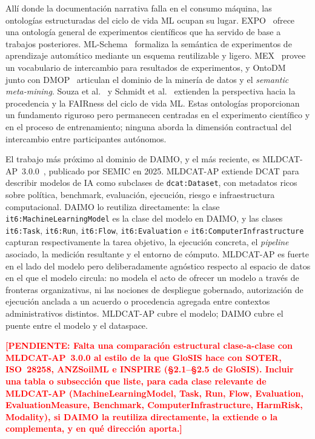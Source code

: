 \documentclass[11pt,a4paper]{article}
\newcommand{\code}[1]{\texttt{#1}}
\newcommand{\TODO}[1]{\textcolor{red}{\textbf{[PENDIENTE: #1]}}}
\begin{document}
Allí donde la documentación narrativa falla en el consumo máquina, las ontologías estructuradas del ciclo de vida ML ocupan su lugar. EXPO~\cite{expo} ofrece una ontología general de experimentos científicos que ha servido de base a trabajos posteriores. ML-Schema~\cite{mls} formaliza la semántica de experimentos de aprendizaje automático mediante un esquema reutilizable y ligero. MEX~\cite{mex} provee un vocabulario de intercambio para resultados de experimentos, y OntoDM~\cite{ontodm} junto con DMOP~\cite{dmop} articulan el dominio de la minería de datos y el \emph{semantic meta-mining}. Souza et al.~\cite{souza19} y Schmidt et al.~\cite{schmidt21} extienden la perspectiva hacia la procedencia y la FAIRness del ciclo de vida ML. Estas ontologías proporcionan un fundamento riguroso pero permanecen centradas en el experimento científico y en el proceso de entrenamiento; ninguna aborda la dimensión contractual del intercambio entre participantes autónomos.

El trabajo más próximo al dominio de DAIMO, y el más reciente, es MLDCAT-AP~3.0.0~\cite{mldcatap}, publicado por SEMIC en 2025. MLDCAT-AP extiende DCAT para describir modelos de IA como subclases de \code{dcat:Dataset}, con metadatos ricos sobre política, benchmark, evaluación, ejecución, riesgo e infraestructura computacional. DAIMO lo reutiliza directamente: la clase \code{it6:MachineLearningModel} es la clase del modelo en DAIMO, y las clases \code{it6:Task}, \code{it6:Run}, \code{it6:Flow}, \code{it6:Evaluation} e \code{it6:ComputerInfrastructure} capturan respectivamente la tarea objetivo, la ejecución concreta, el \emph{pipeline} asociado, la medición resultante y el entorno de cómputo. MLDCAT-AP es fuerte en el lado del modelo pero deliberadamente agnóstico respecto al espacio de datos en el que el modelo circula: no modela el acto de ofrecer un modelo a través de fronteras organizativas, ni las nociones de despliegue gobernado, autorización de ejecución anclada a un acuerdo o procedencia agregada entre contextos administrativos distintos. MLDCAT-AP cubre el modelo; DAIMO cubre el puente entre el modelo y el dataspace.

\TODO{Falta una comparación estructural clase-a-clase con MLDCAT-AP~3.0.0 al estilo de la que GloSIS hace con SOTER, ISO~28258, ANZSoilML e INSPIRE (§2.1--§2.5 de GloSIS). Incluir una tabla o subsección que liste, para cada clase relevante de MLDCAT-AP (MachineLearningModel, Task, Run, Flow, Evaluation, EvaluationMeasure, Benchmark, ComputerInfrastructure, HarmRisk, Modality), si DAIMO la reutiliza directamente, la extiende o la complementa, y en qué dirección aporta.}
\end{document}
